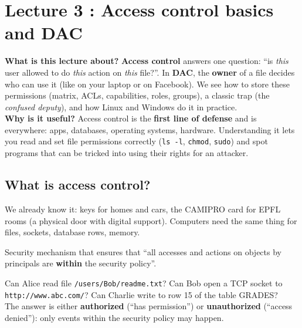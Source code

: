 \chapter{Lecture 3 : Access control basics and DAC}

\begin{rembox}[title=In a nutshell]
\textbf{What is this lecture about?} \textbf{Access control} answers one question:
``is \emph{this} user allowed to do \emph{this} action on \emph{this} file?''. In
\textbf{DAC}, the \textbf{owner} of a file decides who can use it (like on your laptop or
on Facebook). We see how to store these permissions (matrix, ACLs, capabilities, roles,
groups), a classic trap (the \emph{confused deputy}), and how Linux and Windows do it in
practice. \\
\textbf{Why is it useful?} Access control is the \textbf{first line of defense} and is
everywhere: apps, databases, operating systems, hardware. Understanding it lets you read
and set file permissions correctly (\texttt{ls -l}, \texttt{chmod}, \texttt{sudo}) and
spot programs that can be tricked into using their rights for an attacker.
\end{rembox}

\section{What is access control?}

\begin{rembox}[title=Access control in the physical world]
We already know it: keys for homes and cars, the CAMIPRO card for EPFL rooms (a physical door
with digital support). Computers need the same thing for files, sockets, database rows, memory.
\end{rembox}

\begin{defnbox}[title=Access control]
Security mechanism that ensures that ``all accesses and actions on objects by principals
are \textbf{within} the security policy''.
\end{defnbox}

\begin{exbox}[title=Questions an access control system answers]
Can Alice read file \texttt{/users/Bob/readme.txt}? Can Bob open a TCP socket to
\texttt{http://www.abc.com/}? Can Charlie write to row 15 of the table GRADES? \\
The answer is either \textbf{authorized} (``has permission'') or
\textbf{unauthorized} (``access denied''): only events within the security policy may
happen.
\end{exbox}

